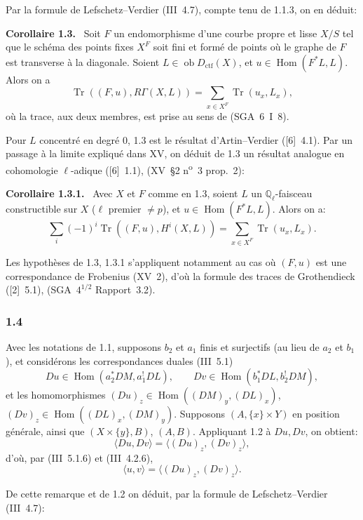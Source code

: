 \documentclass[11pt]{article}
\newenvironment{statement}[1]{\par\medskip\noindent\textbf{#1.}\ }{\par\medskip}
\DeclareMathOperator{\Hom}{Hom}
\newcommand{\ob}{\operatorname{ob}}
\providecommand{\ctf}{\mathrm{ctf}}
\providecommand{\Tr}{\operatorname{Tr}}
\providecommand{\Tr}{\operatorname{Tr}}
\providecommand{\Tr}{\operatorname{Tr}}
\providecommand{\Hom}{\operatorname{Hom}}
\providecommand{\ob}{\operatorname{ob}}
\providecommand{\Tr}{\operatorname{Tr}}
\providecommand{\Hom}{\operatorname{Hom}}
\providecommand{\Tr}{\operatorname{Tr}}
\begin{document}
Par la formule de Lefschetz--Verdier (III~4.7), compte tenu de 1.1.3, on en déduit:

\begin{statement}{Corollaire 1.3}
Soit $F$ un endomorphisme d'une courbe propre et lisse $X/S$ tel que le schéma des points fixes $X^F$ soit fini et formé de points où le graphe de $F$ est transverse à la diagonale. Soient $L\in\ob D_{\ctf}(X)$, et $u\in\Hom(F^*L,L)$. Alors on a
\[
\Tr((F,u),R\Gamma(X,L))=\sum_{x\in X^F}\Tr(u_x,L_x),
\]
où la trace, aux deux membres, est prise au sens de (SGA~6~I~8).
\end{statement}

Pour $L$ concentré en degré $0$, 1.3 est le résultat d'Artin--Verdier ([6]~4.1). Par un passage à la limite expliqué dans XV, on déduit de 1.3 un résultat analogue en cohomologie $\ell$-adique ([6]~1.1), (XV~\S2 n\textsuperscript{o}~3 prop.~2):

\begin{statement}{Corollaire 1.3.1}
Avec $X$ et $F$ comme en 1.3, soient $L$ un $\mathbb Q_\ell$-faisceau constructible sur $X$ ($\ell$ premier $\ne p$), et $u\in\Hom(F^*L,L)$. Alors on a:
\[
\sum_i(-1)^i\Tr((F,u),H^i(X,L))=\sum_{x\in X^F}\Tr(u_x,L_x).
\]
\end{statement}

Les hypothèses de 1.3, 1.3.1 s'appliquent notamment au cas où $(F,u)$ est une correspondance de Frobenius (XV~2), d'où la formule des traces de Grothendieck ([2]~5.1), (SGA~$4^{1/2}$ Rapport~3.2).

\subsubsection*{1.4}
Avec les notations de 1.1, supposons $b_2$ et $a_1$ finis et surjectifs (au lieu de $a_2$ et $b_1$), et considérons les correspondances duales (III~5.1)
\[
Du\in\Hom(a_2^*DM,a_1^!DL),\qquad Dv\in\Hom(b_1^*DL,b_2^!DM),
\]
et les homomorphismes $(Du)_z\in\Hom((DM)_y,(DL)_x)$, $(Dv)_z\in\Hom((DL)_x,(DM)_y)$. Supposons $(A,\{x\}\times Y)$ en position générale, ainsi que $(X\times\{y\},B)$, $(A,B)$. Appliquant 1.2 à $Du,Dv$, on obtient:
\[
\langle Du,Dv\rangle=\langle (Du)_z,(Dv)_z\rangle,
\]
d'où, par (III~5.1.6) et (III~4.2.6),
\begin{equation}\tag{1.4.1}
\langle u,v\rangle=\langle (Du)_z,(Dv)_z\rangle.
\end{equation}

De cette remarque et de 1.2 on déduit, par la formule de Lefschetz--Verdier (III~4.7):
\end{document}
